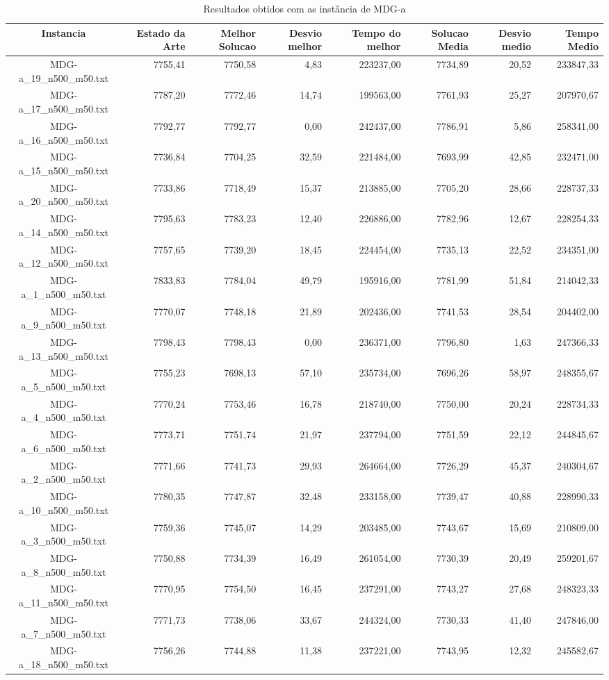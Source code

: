 \begin{landscape}
	\begin{table}[t]
	\centering
	\begin{tabular}{| c | r | r | r | r | r | r | r |  }
\hline
Instancia&Estado da Arte&Melhor Solucao&Desvio melhor&Tempo do melhor&Solucao Media&Desvio medio&Tempo Medio\\ \hline 
		MDG-a\_19\_n500\_m50.txt&7755,41&7750,58&4,83&223237,00&7734,89&20,52&233847,33\\
		MDG-a\_17\_n500\_m50.txt&7787,20&7772,46&14,74&199563,00&7761,93&25,27&207970,67\\
		MDG-a\_16\_n500\_m50.txt&7792,77&7792,77&0,00&242437,00&7786,91&5,86&258341,00\\
		MDG-a\_15\_n500\_m50.txt&7736,84&7704,25&32,59&221484,00&7693,99&42,85&232471,00\\
		MDG-a\_20\_n500\_m50.txt&7733,86&7718,49&15,37&213885,00&7705,20&28,66&228737,33\\
		MDG-a\_14\_n500\_m50.txt&7795,63&7783,23&12,40&226886,00&7782,96&12,67&228254,33\\
		MDG-a\_12\_n500\_m50.txt&7757,65&7739,20&18,45&224454,00&7735,13&22,52&234351,00\\
		MDG-a\_1\_n500\_m50.txt&7833,83&7784,04&49,79&195916,00&7781,99&51,84&214042,33\\
		MDG-a\_9\_n500\_m50.txt&7770,07&7748,18&21,89&202436,00&7741,53&28,54&204402,00\\
		MDG-a\_13\_n500\_m50.txt&7798,43&7798,43&0,00&236371,00&7796,80&1,63&247366,33\\
		MDG-a\_5\_n500\_m50.txt&7755,23&7698,13&57,10&235734,00&7696,26&58,97&248355,67\\
		MDG-a\_4\_n500\_m50.txt&7770,24&7753,46&16,78&218740,00&7750,00&20,24&228734,33\\
		MDG-a\_6\_n500\_m50.txt&7773,71&7751,74&21,97&237794,00&7751,59&22,12&244845,67\\
		MDG-a\_2\_n500\_m50.txt&7771,66&7741,73&29,93&264664,00&7726,29&45,37&240304,67\\
		MDG-a\_10\_n500\_m50.txt&7780,35&7747,87&32,48&233158,00&7739,47&40,88&228990,33\\
		MDG-a\_3\_n500\_m50.txt&7759,36&7745,07&14,29&203485,00&7743,67&15,69&210809,00\\
		MDG-a\_8\_n500\_m50.txt&7750,88&7734,39&16,49&261054,00&7730,39&20,49&259201,67\\
		MDG-a\_11\_n500\_m50.txt&7770,95&7754,50&16,45&237291,00&7743,27&27,68&248323,33\\
		MDG-a\_7\_n500\_m50.txt&7771,73&7738,06&33,67&244324,00&7730,33&41,40&247846,00\\
		MDG-a\_18\_n500\_m50.txt&7756,26&7744,88&11,38&237221,00&7743,95&12,32&245582,67\\
\hline
	\end{tabular}
	\caption{Resultados obtidos com as instância de MDG-a}
	\label{tabela_mdg_a}
	\end{table}
\end{landscape}
